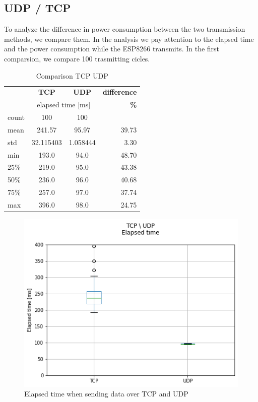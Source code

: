 \subsection{UDP / TCP}
To analyze the difference in power consumption between the two transmission methods,
we compare them. In the analysis we pay attention to the elapsed time and the power consumption while the
ESP8266 transmits. In the first comparsion, we compare 100 trasmitting cicles.
\linebreak
\begin{table}[htbp]
    \begin{center}
    \caption{Comparison TCP UDP}
    \label{tab:table3}
    \renewcommand{\arraystretch}{1.8}
    \begin{tabular}{l|c|c|r}
    & \textbf{TCP} & \textbf{UDP} & \textbf{difference} \\
    & \multicolumn{2}{c|}{elapsed time [ms]} & \textbf{\%}\\
    \hline
    count & 100 & 100 & \\
    mean  & 241.57 & 95.97 & 39.73 \\
    std   & 32.115403 & 1.058444 & 3.30 \\
    min   & 193.0 & 94.0 & 48.70 \\
    25\%  & 219.0 & 95.0 & 43.38 \\
    50\%  & 236.0 & 96.0 & 40.68 \\
    75\%  & 257.0 & 97.0 & 37.74 \\
    max   & 396.0 & 98.0 & 24.75 \\
    \end{tabular}
    \end{center}
\end{table}
\linebreak
\begin{figure}[h]
    \centering
    \includegraphics[width = 1 \linewidth]{fig/udp_tcp/udp_tcp_boxplot_time.png}
    \caption{Elapsed time when sending data over TCP and UDP}
    \label{fig:udp_tcp_boxplot_time}
    \end{figure}

